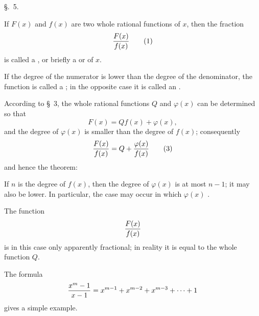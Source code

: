 
\begin{center}
{\large \S.\ 5.}

\vspace{0.5em}
{\large{}}
\end{center}

If $F(x)$ and $f(x)$ are two whole rational functions of $x$, then
the fraction
\begin{equation}
 {F(x)\over f(x)}
\tag{1}
\end{equation}
is called a , or briefly a
 or  of $x$.

If the degree of the numerator is lower than the degree of the
denominator, the function is called a ; in
the opposite case it is called an .

According to \S~3, the whole rational functions $Q$ and $\varphi(x)$
can be determined so that
\begin{equation}
 F(x)=Qf(x)+\varphi(x),
\tag{2}
\end{equation}
and the degree of $\varphi(x)$ is smaller than the degree of $f(x)$;
consequently
\begin{equation}
 {F(x)\over f(x)}=Q+{\varphi(x)\over f(x)}
\tag{3}
\end{equation}
and hence the theorem:


If $n$ is the degree of $f(x)$, then the degree of $\varphi(x)$ is at
most $n-1$; it may also be lower. In particular, the case may occur in
which $\varphi(x)$ .

 The function
\[
 {F(x)\over f(x)}
\]
is in this case only apparently fractional; in reality it is equal to
the whole function $Q$.

The formula
\[
 {x^m-1\over x-1}=x^{m-1}+x^{m-2}+x^{m-3}+\cdots+1
\]
gives a simple example.
